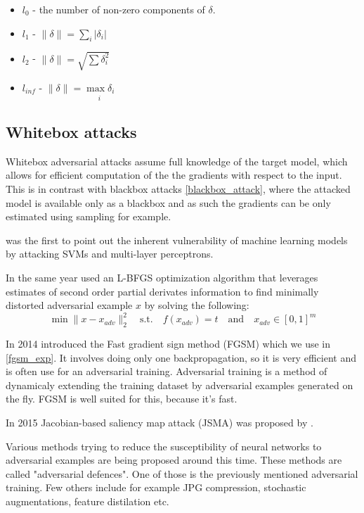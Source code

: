 \begin{itemize}
    \item $l_{0}$ - the number of non-zero components of $\delta$.
    \item $l_{1}$ - $\lVert \delta \rVert = \underset{i}{\sum} \lvert \delta_{i} \rvert$
    \item $l_{2}$ - $\lVert \delta \rVert = \sqrt{\sum \delta_{i}^2}$
    \item $l_{inf}$ - $\lVert \delta \rVert = \underset{i}{\max \delta_{i}}$
\end{itemize}



\subsection{Whitebox attacks}
Whitebox adversarial attacks assume full knowledge of the target model, which allows for efficient computation of the the gradients with respect to the input. This is in contrast with blackbox attacks \ref{blackbox_attack}, where the attacked model is available only as a blackbox and as such the gradients can be only estimated using sampling for example.

\cite{Biggio2013EvasionAA} was the first to point out the inherent vulnerability of machine learning models by attacking SVMs and multi-layer perceptrons.


In the same year \cite{szegedy2014intriguing} used an L-BFGS optimization algorithm that leverages estimates of second order partial derivates information to find minimally distorted adversarial example $x$ by solving the following:
$$\min \lVert x - x_{adv} \rVert_2^2 \quad \text{s.t.} \quad f(x_{adv}) = t \quad \text{and} \quad x_{adv} \in [0, 1]^m$$


In 2014 \cite{goodfellow2015explaining} introduced the Fast gradient sign method (FGSM) which we use in \ref{fgsm_exp}. It involves doing only one backpropagation, so it is very efficient and is often use for an adversarial training. Adversarial training is a method of dynamicaly extending the training dataset by adversarial examples generated on the fly. FGSM is well suited for this, because it's fast.

In 2015 Jacobian-based saliency map attack (JSMA) was proposed by \cite{papernot2015limitations}.

Various methods trying to reduce the susceptibility of neural networks to adversarial examples are being proposed around this time. These methods are called "adversarial defences". One of those is the previously mentioned adversarial training. Few others include for example JPG compression, stochastic augmentations, feature distilation etc.

